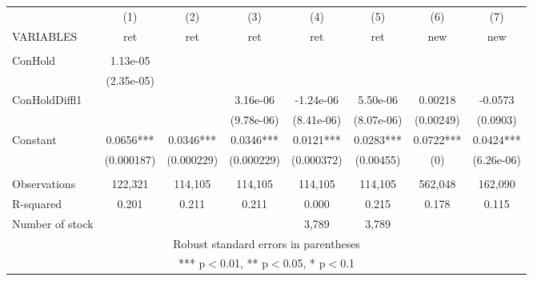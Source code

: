 \documentclass[]{article}
\begin{document}
\begin{tabular}{lccccccc} \hline
 & (1) & (2) & (3) & (4) & (5) & (6) & (7) \\
VARIABLES & ret & ret & ret & ret & ret & new & new \\ \hline
 &  &  &  &  &  &  &  \\
ConHold & 1.13e-05 &  &  &  &  &  &  \\
 & (2.35e-05) &  &  &  &  &  &  \\
ConHoldDiffl1 &  &  & 3.16e-06 & -1.24e-06 & 5.50e-06 & 0.00218 & -0.0573 \\
 &  &  & (9.78e-06) & (8.41e-06) & (8.07e-06) & (0.00249) & (0.0903) \\
Constant & 0.0656*** & 0.0346*** & 0.0346*** & 0.0121*** & 0.0283*** & 0.0722*** & 0.0424*** \\
 & (0.000187) & (0.000229) & (0.000229) & (0.000372) & (0.00455) & (0) & (6.26e-06) \\
 &  &  &  &  &  &  &  \\
Observations & 122,321 & 114,105 & 114,105 & 114,105 & 114,105 & 562,048 & 162,090 \\
R-squared & 0.201 & 0.211 & 0.211 & 0.000 & 0.215 & 0.178 & 0.115 \\
 Number of stock &  &  &  & 3,789 & 3,789 &  &  \\ \hline
\multicolumn{8}{c}{ Robust standard errors in parentheses} \\
\multicolumn{8}{c}{ *** p$<$0.01, ** p$<$0.05, * p$<$0.1} \\
\end{tabular}
\end{document}
